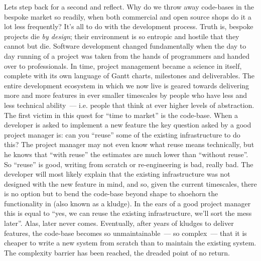 \documentclass{book}
\begin{document}
Lets step back for a second and reflect. Why do we throw away
code-bases in the bespoke market so readily, when both commercial and
open source shops do it a lot less frequently? It's all to do with the
development process. Truth is, bespoke projects die \emph{by design};
their environment is so entropic and hostile that they cannot but
die. Software development changed fundamentally when the day to day
running of a project was taken from the hands of programmers and
handed over to professionals. In time, project management became a
science in itself, complete with its own language of Gantt charts,
milestones and deliverables. The entire development ecosystem in which
we now live is geared towards delivering more and more features in
ever smaller timescales by people who have less and less technical
ability~--- i.e. people that think at ever higher levels of
abstraction. The first victim in this quest for ``time to market'' is
the code-base. When a developer is asked to implement a new feature
the key question asked by a good project manager is: can you ``reuse''
some of the existing infrastructure to do this? The project manager
may not even know what reuse means technically, but he knows that
``with reuse'' the estimates are much lower than ``without reuse''. So
``reuse'' is good, writing from scratch or re-engineering is bad, really
bad. The developer will most likely explain that the existing
infrastructure was not designed with the new feature in mind, and so,
given the current timescales, there is no option but to bend the
code-base beyond shape to shoehorn the functionality in (also known as
a kludge). In the ears of a good project manager this is equal to
``yes, we can reuse the existing infrastructure, we'll sort the mess
later''. Alas, later never comes. Eventually, after years of kludges to
deliver features, the code-base becomes so unmaintainable~--- so
complex~--- that it is cheaper to write a new system from scratch than
to maintain the existing system. The complexity barrier has been
reached, the dreaded point of no return.
\end{document}
